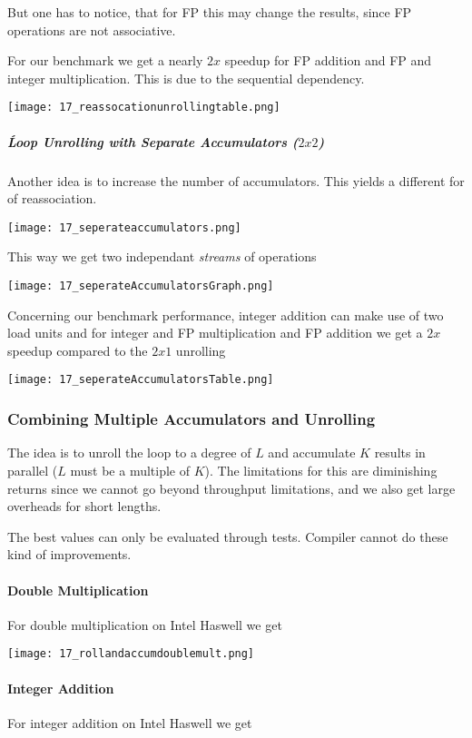 But one has to notice, that for FP this may change the results, since FP operations are not associative.

For our benchmark we get a nearly $2x$ speedup for FP addition and FP and integer multiplication. This is due to the sequential dependency.

\texttt{[image: 17\_reassocationunrollingtable.png]}

\subparagraph{Ĺoop Unrolling with Separate Accumulators ($2x2$)}
Another idea is to increase the number of accumulators. This yields a different for of reassociation.

\texttt{[image: 17\_seperateaccumulators.png]}

This way we get two independant \textit{streams} of operations

\texttt{[image: 17\_seperateAccumulatorsGraph.png]}

Concerning our benchmark performance, integer addition can make use of two load units and for integer and FP multiplication and FP addition we get a $2x$ speedup compared to the $2x1$ unrolling

\texttt{[image: 17\_seperateAccumulatorsTable.png]}

\subsubsection{Combining Multiple Accumulators and Unrolling}
The idea is to unroll the loop to a degree of $L$ and accumulate $K$ results in parallel ($L$ must be a multiple of $K$). The limitations for this are diminishing returns since we cannot go beyond throughput limitations, and we also get large overheads for short lengths.

The best values can only be evaluated through tests. Compiler cannot do these kind of improvements.

\paragraph{Double Multiplication}
For double multiplication on Intel Haswell we get

\texttt{[image: 17\_rollandaccumdoublemult.png]}

\paragraph{Integer Addition}
For integer addition on Intel Haswell we get

